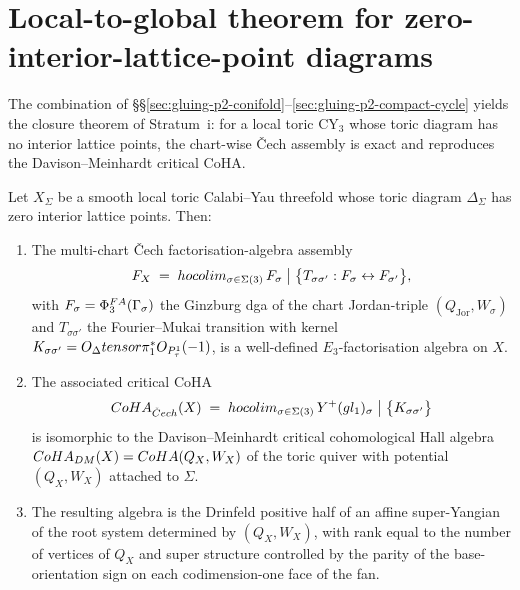\section{Local-to-global theorem for zero-interior-lattice-point diagrams}
\label{sec:gluing-p2-local-to-global}

The combination of \S\S\ref{sec:gluing-p2-conifold}--\ref{sec:gluing-p2-compact-cycle}
yields the closure theorem of Stratum~i: for a local toric CY$_3$ whose
toric diagram has no interior lattice points, the chart-wise \v{C}ech
assembly is exact and reproduces the Davison--Meinhardt critical CoHA.

\begin{theorem}
\label{thm:local-to-global-zero-interior}
Let $X_\Sigma$ be a smooth local toric Calabi--Yau threefold whose toric
diagram $\Delta_\Sigma$ has zero interior lattice points.  Then:
\begin{enumerate}[label=\emph{(\arabic*)}, leftmargin=2em]
\item The multi-chart \v{C}ech factorisation-algebra assembly
\[
  F_X \;=\; hocolim_{\sigma \in \Sigma(3)}\,
    F_\sigma
    \;\big|\;
    \bigl\{T_{\sigma \sigma'} : F_\sigma \leftrightarrow F_{\sigma'}\bigr\},
\]
with $F_\sigma = \Phi^{FA}_3(\Gamma_\sigma)$ the Ginzburg dga of the
chart Jordan-triple $(Q_{\mathrm{Jor}}, W_\sigma)$ and $T_{\sigma \sigma'}$
the Fourier--Mukai transition with kernel $K_{\sigma \sigma'} = O_\Delta
tensor \pi_1^*O_{P^1_\tau}(-1)$, is a well-defined $E_3$-factorisation
algebra on $X$.
\item The associated critical CoHA
\[
  CoHA_{\check Cech}(X)
  \;=\;
  hocolim_{\sigma \in \Sigma(3)}\,
    Y^+(gl_1)_\sigma
    \;\big|\;
    \bigl\{K_{\sigma \sigma'}\bigr\}
\]
is isomorphic to the Davison--Meinhardt critical cohomological Hall
algebra
\(
  CoHA_{DM}(X) = CoHA(Q_X, W_X)
\)
of the toric quiver with potential $(Q_X, W_X)$ attached to $\Sigma$.
\item The resulting algebra is the Drinfeld positive half of an affine
super-Yangian of the root system determined by $(Q_X, W_X)$, with rank
equal to the number of vertices of $Q_X$ and super structure controlled
by the parity of the base-orientation sign on each codimension-one face
of the fan.
\end{enumerate}
\end{theorem}

